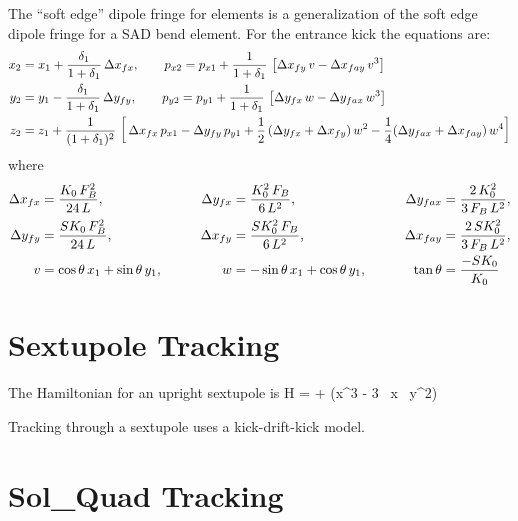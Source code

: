 The ``soft edge'' dipole fringe for  elements is a generalization of the soft edge
dipole fringe for a SAD bend element. For the entrance kick the equations are:
\begin{align}
  x_2 &= x_1 + \frac{\delta_1}{1 + \delta_1} \, \Delta x_{fx}, \qquad
  p_{x2} = p_{x1} + \frac{1}{1 + \delta_1} \, \left[ 
    \Delta x_{fy} \, v - \Delta x_{fay} \, v^3 \right] \nonumber \\
  y_2 &= y_1 - \frac{\delta_1}{1 + \delta_1} \, \Delta y_{fy}, \qquad
  p_{y2} = p_{y1} + \frac{1}{1 + \delta_1} \, \left[ 
    \Delta y_{fx} \, w - \Delta y_{fax} \, w^3 \right] \\
  z_2 &= z_1 + \frac{1}{(1 + \delta_1)^2} \, \left[ \, 
    \Delta x_{fx} \, p_{x1} - \Delta y_{fy} \, p_{y1} + 
    \frac{1}{2} \, (\Delta y_{fx} + \Delta x_{fy}) \, w^2 -
    \frac{1}{4} (\Delta y_{fax} + \Delta x_{fay}) \, w^4
    \right] \nonumber
\end{align}
where
\begin{alignat}{3}
  \Delta x_{fx}  &= \frac{K_0 \, F_B^2}{24 \, L}, & \qquad 
  \Delta y_{fx}  &= \frac{K_0^2 \, F_B}{6 \, L^2}, & \qquad 
  \Delta y_{fax} &= \frac{2 \, K_0^2}{3 \, F_B \, L^2}, \nonumber \\ 
  \Delta y_{fy}  &= \frac{SK_0 \, F_B^2}{24 \, L}, & \qquad
  \Delta x_{fy}  &= \frac{SK_0^2 \, F_B}{6 \, L^2}, & \qquad
  \Delta x_{fay} &= \frac{2 \, SK_0^2}{3 \, F_B \, L^2}, \\
  v &= \cos\theta \, x_1 + \sin\theta \, y_1, & \qquad
  w &= -\sin\theta \, x_1 + \cos\theta \, y_1, & \qquad
  \tan\theta &= \frac{-SK_0}{K_0} \nonumber
\end{alignat}


\section{Sextupole Tracking}
\label{s:sextupole.std}

The Hamiltonian for an upright sextupole is
\Begineq
  H =  +  (x^3 - 3 \, x \, y^2)
\Endeq

Tracking through a sextupole uses a kick-drift-kick model.

\section{Sol\_Quad Tracking}
\label{s:sol.quad.std}

